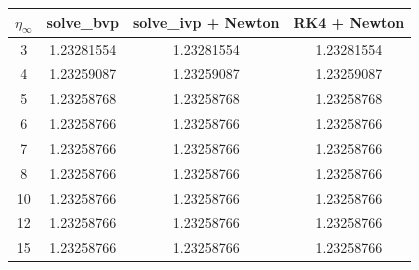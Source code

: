 \begin{tabular}{cccc}
\toprule
$\eta_\infty$ & solve\_bvp & solve\_ivp + Newton & RK4 + Newton \\
\midrule
3 & 1.23281554 & 1.23281554 & 1.23281554 \\
4 & 1.23259087 & 1.23259087 & 1.23259087 \\
5 & 1.23258768 & 1.23258768 & 1.23258768 \\
6 & 1.23258766 & 1.23258766 & 1.23258766 \\
7 & 1.23258766 & 1.23258766 & 1.23258766 \\
8 & 1.23258766 & 1.23258766 & 1.23258766 \\
10 & 1.23258766 & 1.23258766 & 1.23258766 \\
12 & 1.23258766 & 1.23258766 & 1.23258766 \\
15 & 1.23258766 & 1.23258766 & 1.23258766 \\
\bottomrule
\end{tabular}
